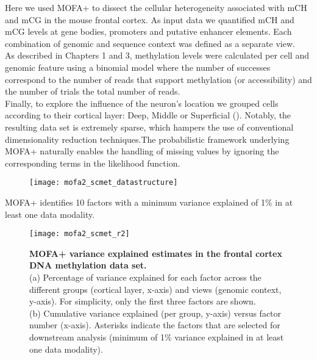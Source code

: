 Here we used MOFA+ to dissect the cellular heterogeneity associated with mCH and mCG in the mouse frontal cortex. As input data we quantified mCH and mCG levels at gene bodies, promoters and putative enhancer elements. Each combination of genomic and sequence context was defined as a separate view.\\
As described in Chapters 1 and 3, methylation levels were calculated per cell and genomic feature using a binomial model where the number of successes correspond to the number of reads that support methylation (or accessibility) and the number of trials the total number of reads.\\
Finally, to explore the influence of the neuron's location we grouped cells according to their cortical layer: Deep, Middle or Superficial (). Notably, the resulting data set is extremely sparse, which hampers the use of conventional dimensionality reduction techniques.The probabilistic framework underlying MOFA+ naturally enables the handling of missing values by ignoring the corresponding terms in the likelihood function.

\begin{figure}[H]
	\centering
	\texttt{[image: mofa2\_scmet\_datastructure]}
	\caption[]{}
	\label{fig:mofa2_scmet_datastructure}
\end{figure}


MOFA+ identifies 10 factors with a minimum variance explained of 1\% in at least one data modality. 

\begin{figure}[H]
	\centering
	\texttt{[image: mofa2\_scmet\_r2]}
	\caption[]{
	\textbf{MOFA+ variance explained estimates in the frontal cortex DNA methylation data set.} \\
	(a) Percentage of variance explained for each factor across the different groups (cortical layer, x-axis) and views (genomic context, y-axis). For simplicity, only the first three factors are shown. \\
	(b) Cumulative variance explained (per group, y-axis) versus factor number (x-axis). Asterisks indicate the factors that are selected for downstream analysis (minimum of 1\% variance explained in at least one data modality).
	}
	\label{fig:mofa2_scmet_r2}
\end{figure}

